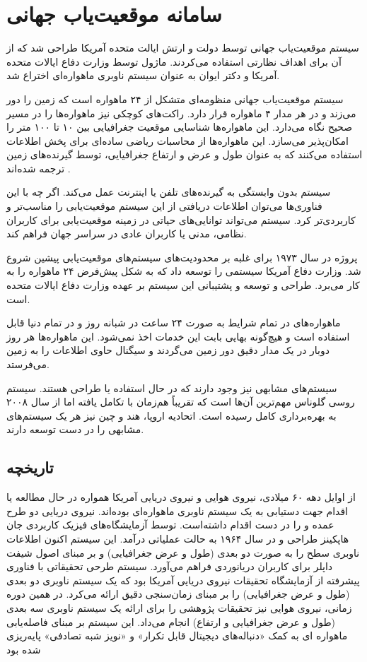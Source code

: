 \section{سامانه موقعیت‌یاب جهانی}
سیستم موقعیت‌‌یاب جهانی توسط دولت و ارتش ایالت متحده آمریکا طراحی شد که از آن برای اهداف نظارتی استفاده می‌کردند. ماژول  توسط وزارت دفاع ایالات متحده آمریکا و دکتر ایوان  به عنوان سیستم ناوبری ماهواره‌‌ای اختراع شد.


سیستم موقعیت‌یاب جهانی منظومه‌ای متشکل از ۲۴ ماهواره است که زمین را دور می‌زند و در هر مدار ۴ ماهواره قرار دارد. راکت‌های کوچکی نیز ماهواره‌ها را در مسیر صحیح نگاه می‌دارد.
این ماهواره‌ها شناسایی موقعیت جغرافیایی بین ۱۰ تا ۱۰۰ متر را امکان‌پذیر می‌سازد. این ماهواره‌ها از محاسبات ریاضی ساده‌ای برای پخش اطلاعات استفاده می‌کنند که به عنوان طول و عرض و ارتفاع جغرافیایی، توسط گیرنده‌های زمین ترجمه شده‌اند \cite{gps}.


سیستم  بدون وابستگی به گیرنده‌های تلفن یا اینترنت عمل می‌کند. اگر چه با این فناوری‌ها می‌توان اطلاعات دریافتی از این سیستم موقعیت‌یابی را مناسب‌تر و کاربردی‌تر کرد. سیستم  می‌تواند توانایی‌های حیاتی در زمینه موقعیت‌یابی برای کاربران نظامی، مدنی یا کاربران عادی در سراسر جهان فراهم کند. 


پروژه  در سال ۱۹۷۳ برای غلبه بر محدودیت‌های سیستم‌های موقعیت‌یابی پیشین شروع شد. وزارت دفاع آمریکا سیستمی را توسعه داد که به شکل پیش‌فرض ۲۴ ماهواره را به کار می‌برد. طراحی و توسعه و پشتیبانی این سیستم بر عهده وزارت دفاع ایالات متحده است.


ماهواره‌های  در تمام شرایط به صورت ۲۴ ساعت در شبانه روز و در تمام دنیا قابل استفاده است و هیچ‌گونه بهایی بابت این خدمات اخذ نمی‌شود. این ماهواره‌ها هر روز دوبار در یک مدار دقیق دور زمین می‌گردند و سیگنال حاوی اطلاعات را به زمین می‌فرستد.


سیستم‌های مشابهی نیز وجود دارند که در حال استفاده یا طراحی هستند. سیستم روسی گلوناس مهم‌ترین آن‌ها است که تقریباً هم‌زمان با  تکامل یافته اما از سال ۲۰۰۸ به بهره‌برداری کامل رسیده‌ است. اتحادیه اروپا، هند و چین نیز هر یک سیستم‌های مشابهی را در دست توسعه دارند.

\subsection{تاریخچه}
از اوایل دهه ۶۰ میلادی، نیروی هوایی و نیروی دریایی آمریکا همواره در حال مطالعه یا اقدام جهت دستیابی به یک سیستم ناوبری ماهواره‌ای بوده‌اند. نیروی دریایی دو طرح عمده  و  را در دست اقدام داشته‌است.  توسط آزمایشگاه‌های فیزیک کاربردی جان هاپکینز طراحی و در سال ۱۹۶۴ به حالت عملیاتی درآمد. این سیستم اکنون اطلاعات ناوبری سطح را به‌ صورت دو بعدی (طول و عرض جغرافیایی) و بر مبنای اصول شیفت داپلر برای کاربران دریانوردی فراهم می‌آورد. سیستم   طرحی تحقیقاتی با فناوری پیشرفته از آزمایشگاه تحقیقات نیروی دریایی آمریکا بود که یک سیستم ناوبری دو بعدی (طول و عرض جغرافیایی) را بر مبنای زمان‌سنجی دقیق ارائه می‌کرد. در همین دوره زمانی، نیروی هوایی نیز تحقیقات پژوهشی را برای ارائه یک سیستم ناوبری سه بعدی (طول و عرض جغرافیایی و ارتفاع) انجام می‌داد. این سیستم بر مبنای فاصله‌یابی ماهواره ای به کمک «دنباله‌های دیجیتال قابل تکرار» و «نویز شبه تصادفی» پایه‌ریزی شده بود

